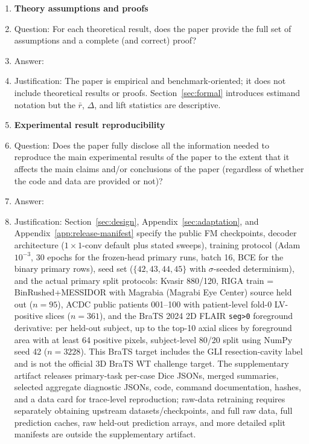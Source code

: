 \begin{enumerate}[leftmargin=*,itemsep=2pt,parsep=0pt,topsep=2pt]
\item {\bf Theory assumptions and proofs}
    \item[] Question: For each theoretical result, does the paper provide the full set of assumptions and a complete (and correct) proof?
    \item[] Answer: \answerNA{}
    \item[] Justification: The paper is empirical and benchmark-oriented; it does not include theoretical results or proofs. Section~\ref{sec:formal} introduces estimand notation but the $\bar{r}$, $\Delta$, and lift statistics are descriptive.

\item {\bf Experimental result reproducibility}
    \item[] Question: Does the paper fully disclose all the information needed to reproduce the main experimental results of the paper to the extent that it affects the main claims and/or conclusions of the paper (regardless of whether the code and data are provided or not)?
    \item[] Answer: \answerYes{}
\item[] Justification: Section~\ref{sec:design}, Appendix~\ref{sec:adaptation}, and Appendix~\ref{app:release-manifest} specify the public FM checkpoints, decoder architecture ($1{\times}1$-conv default plus stated sweeps), training protocol (Adam $10^{-3}$, 30 epochs for the frozen-head primary runs, batch 16, BCE for the binary primary rows), seed set ($\{42,43,44,45\}$ with $\sigma$-seeded determinism), and the actual primary split protocols: Kvasir 880/120, RIGA train = BinRushed+MESSIDOR with Magrabia (Magrabi Eye Center) source held out ($n{=}95$), ACDC public patients 001--100 with patient-level fold-0 LV-positive slices ($n{=}361$), and the BraTS 2024 2D FLAIR \texttt{seg>0} foreground derivative: per held-out subject, up to the top-10 axial slices by foreground area with at least 64 positive pixels, subject-level 80/20 split using NumPy seed 42 ($n{=}3228$). This BraTS target includes the GLI resection-cavity label and is not the official 3D BraTS WT challenge target. The supplementary artifact releases primary-task per-case Dice JSONs, merged summaries, selected aggregate diagnostic JSONs, code, command documentation, hashes, and a data card for trace-level reproduction; raw-data retraining requires separately obtaining upstream datasets/checkpoints, and full raw data, full prediction caches, raw held-out prediction arrays, and more detailed split manifests are outside the supplementary artifact.


\end{enumerate}
